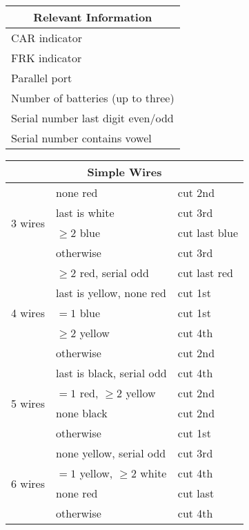 \documentclass[11pt]{article}
\begin{document}
\begin{multicols}{2}


\begin{tabular}{|l|}
\hline
\multicolumn{1}{|c|}{Relevant Information} \\
\hline
CAR indicator \\
FRK indicator \\
Parallel port \\
Number of batteries (up to three) \\
Serial number last digit even/odd \\
Serial number contains vowel \\
\hline
\end{tabular}

\begin{tabular}{|l|l|l|}
\hline
\multicolumn{3}{|c|}{Simple Wires} \\
\hline
\multirow{4}{*}{3 wires} & none red                    & cut 2nd \\
                         & last is white               & cut 3rd \\
                         & $\ge 2$ blue                & cut last blue \\
                         & otherwise                   & cut 3rd \\
\hline
\multirow{5}{*}{4 wires} & $\ge 2$ red, serial odd     & cut last red \\
                         & last is yellow, none red    & cut 1st \\
                         & $= 1$ blue                  & cut 1st \\
                         & $\ge 2$ yellow              & cut 4th \\
                         & otherwise                   & cut 2nd \\
\hline
\multirow{4}{*}{5 wires} & last is black, serial odd   & cut 4th \\
                         & $= 1$ red, $\ge 2$ yellow   & cut 2nd \\
                         & none black                  & cut 2nd \\
                         & otherwise                   & cut 1st \\
\hline
\multirow{4}{*}{6 wires} & none yellow, serial odd     & cut 3rd \\
                         & $= 1$ yellow, $\ge 2$ white & cut 4th \\
                         & none red                    & cut last \\
                         & otherwise                   & cut 4th \\
\hline
\end{tabular}


\end{multicols}
\end{document}
